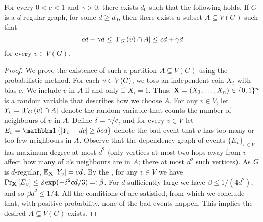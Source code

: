 \documentclass[11pt]{article}
\providecommand{\DIFaddend}{} %
\begin{document}
\DIFaddend \begin{lemma} \label{thm:partition}
For every $0 < c < 1$ and $\gamma> 0$, there exists $d_0$ such that the following holds. If $G$ is a $d$-regular graph, for some $d \ge d_0$, then there exists a subset $A \subseteq V(G)$ such that
$$
    cd - \gamma d \leq \left| \Neighbourhood{G}{v} \cap A \right| \leq cd + \gamma d 
$$
for every $v \in V(G)$.
\end{lemma}
\begin{proof}
We prove the existence of such a partition $A \subseteq V(G)$ using the probabilistic method.
For each $v \in \Vertices{\Graph}$, we toss an independent coin $X_i$ with bias $c$.
We include $v$ in $A$ if and only if $X_i = 1$. Thus, $\vec{X} \Def (X_1, \dots, X_n) \in \bit^n$ is a random variable that describes how we choose $A$. For any $v \in V$, let $Y_v \Def |\Neighbourhood{G}{v} \cap \RedA|$ denote the random variable that counts the number of neighbours of $v$ in $A$.
Define $\delta \Def \gamma / c$, and for every $v \in V$ let $E_v = \Indicator{|Y_v - d c | \geq \delta c d}$ denote the bad event that $v$ has too many or too few neighbours in $A$.
Observe that the dependency graph of events $\{ E_v \}_{v \in V}$ has maximum degree at most $d^2$ (only vertices at most two hops away from $v$ affect how many of $v$'s neighbours are in $A$; there at most $d^2$ such vertices).
As $\Graph$ is $d$-regular, $\Mean{\vec{X}}{Y_v} = c d$. By the , for any $v \in V$ we have $\PProb{E_v}{\vec{X}} \leq 2\exp(-\delta^2c d/3) =: \beta$.
For $d$ sufficiently large we have $\beta \leq 1/(4d^2)$, and so $\beta d^2 \leq 1/4$. All the conditions of  are satisfied, from which we conclude that, with positive probability, none of the bad events happen. This implies the desired $A \subseteq V(G)$ exists.
\end{proof}
\end{document}
